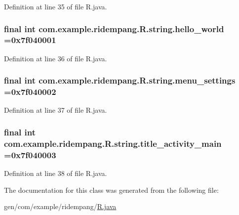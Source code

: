 Definition at line 35 of file R.\-java.

\hypertarget{classcom_1_1example_1_1ridempang_1_1_r_1_1string_a91954e2a53dc9247168c35e58de3d850}{
\subsubsection[{hello\-\_\-world}]{\setlength{\rightskip}{0pt plus 5cm}final int com.\-example.\-ridempang.\-R.\-string.\-hello\-\_\-world =0x7f040001\hspace{0.3cm}{\ttfamily [static]}}}\label{classcom_1_1example_1_1ridempang_1_1_r_1_1string_a91954e2a53dc9247168c35e58de3d850}


Definition at line 36 of file R.\-java.

\hypertarget{classcom_1_1example_1_1ridempang_1_1_r_1_1string_ad5e574ae94242252052ed48488271eb9}{
\subsubsection[{menu\-\_\-settings}]{\setlength{\rightskip}{0pt plus 5cm}final int com.\-example.\-ridempang.\-R.\-string.\-menu\-\_\-settings =0x7f040002\hspace{0.3cm}{\ttfamily [static]}}}\label{classcom_1_1example_1_1ridempang_1_1_r_1_1string_ad5e574ae94242252052ed48488271eb9}


Definition at line 37 of file R.\-java.

\hypertarget{classcom_1_1example_1_1ridempang_1_1_r_1_1string_a03fd627e26d11562eb40858933fb1d48}{
\subsubsection[{title\-\_\-activity\-\_\-main}]{\setlength{\rightskip}{0pt plus 5cm}final int com.\-example.\-ridempang.\-R.\-string.\-title\-\_\-activity\-\_\-main =0x7f040003\hspace{0.3cm}{\ttfamily [static]}}}\label{classcom_1_1example_1_1ridempang_1_1_r_1_1string_a03fd627e26d11562eb40858933fb1d48}


Definition at line 38 of file R.\-java.



The documentation for this class was generated from the following file\-:\begin{DoxyCompactItemize}
\item 
gen/com/example/ridempang/\hyperlink{_r_8java}{R.\-java}\end{DoxyCompactItemize}
